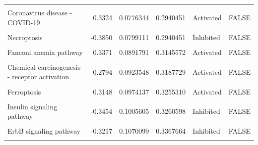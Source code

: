 \documentclass[9pt,a4paper,]{extarticle}
\begin{document}
\begin{table}
{\begin{tabular}[t]{lrrrll}
\cellcolor{gray!6}{Chronic myeloid leukemia} & \cellcolor{gray!6}{-0.3675} & \cellcolor{gray!6}{0.0774357} & \cellcolor{gray!6}{0.2940451} & \cellcolor{gray!6}{Inhibited} & \cellcolor{gray!6}{FALSE}\\
\addlinespace
Coronavirus disease - COVID-19 & 0.3324 & 0.0776344 & 0.2940451 & Activated & FALSE\\
\cellcolor{gray!6}{Cushing syndrome} & \cellcolor{gray!6}{0.3756} & \cellcolor{gray!6}{0.0789040} & \cellcolor{gray!6}{0.2940451} & \cellcolor{gray!6}{Activated} & \cellcolor{gray!6}{FALSE}\\
Necroptosis & -0.3850 & 0.0799111 & 0.2940451 & Inhibited & FALSE\\
\cellcolor{gray!6}{Rap1 signaling pathway} & \cellcolor{gray!6}{0.3348} & \cellcolor{gray!6}{0.0810685} & \cellcolor{gray!6}{0.2940451} & \cellcolor{gray!6}{Activated} & \cellcolor{gray!6}{FALSE}\\
Fanconi anemia pathway & 0.3371 & 0.0891791 & 0.3145572 & Activated & FALSE\\
\addlinespace
\cellcolor{gray!6}{Non-small cell lung cancer} & \cellcolor{gray!6}{-0.3177} & \cellcolor{gray!6}{0.0896635} & \cellcolor{gray!6}{0.3145572} & \cellcolor{gray!6}{Inhibited} & \cellcolor{gray!6}{FALSE}\\
Chemical carcinogenesis - receptor activation & 0.2794 & 0.0923548 & 0.3187729 & Activated & FALSE\\
\cellcolor{gray!6}{Vasopressin-regulated water reabsorption} & \cellcolor{gray!6}{0.3015} & \cellcolor{gray!6}{0.0952416} & \cellcolor{gray!6}{0.3235191} & \cellcolor{gray!6}{Activated} & \cellcolor{gray!6}{FALSE}\\
Ferroptosis & 0.3148 & 0.0974137 & 0.3255310 & Activated & FALSE\\
\cellcolor{gray!6}{Apoptosis} & \cellcolor{gray!6}{0.3510} & \cellcolor{gray!6}{0.0988762} & \cellcolor{gray!6}{0.3255310} & \cellcolor{gray!6}{Activated} & \cellcolor{gray!6}{FALSE}\\
\addlinespace
Insulin signaling pathway & -0.3454 & 0.1005605 & 0.3260598 & Inhibited & FALSE\\
\cellcolor{gray!6}{Gap junction} & \cellcolor{gray!6}{-0.2715} & \cellcolor{gray!6}{0.1052140} & \cellcolor{gray!6}{0.3360568} & \cellcolor{gray!6}{Inhibited} & \cellcolor{gray!6}{FALSE}\\
ErbB signaling pathway & -0.3217 & 0.1070099 & 0.3367664 & Inhibited & FALSE\\
\cellcolor{gray!6}{Prolactin signaling pathway} & \cellcolor{gray!6}{0.3137} & \cellcolor{gray!6}{0.1090413} & \cellcolor{gray!6}{0.3381862} & \cellcolor{gray!6}{Activated} & \cellcolor{gray!6}{FALSE}\\

\end{tabular}}
\end{table}
\end{document}
